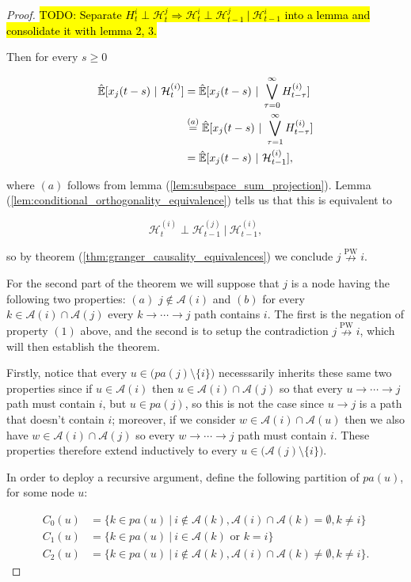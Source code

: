 \documentclass[12pt]{article}
\def\npwgc{\overset{\text{PW}}{\nrightarrow}}  %
\def\H{\mathcal{H}}  %
\newcommand{\linE}[2]{\hat{\E}[#1\ |\ #2]}  %
\newcommand{\pa}[1]{pa(#1)}  %
\newcommand{\anc}[1]{\mathcal{A}(#1)}  %
\begin{document}
\begin{proof}
  \hl{TODO: Separate $H_t^i \perp \H_t^j \Rightarrow \H_t^i \perp \H_{t - 1}^j\ |\ \H_{t - 1}^i$ into a lemma and consolidate it with lemma 2, 3.}

  Then for every $s \ge 0$

  \begin{align*}
    \linE{x_j(t - s)}{\H_t^{(i)}} &= \linE{x_j(t - s)}{\bigvee_{\tau = 0}^\infty H_{t - \tau}^{(i)}}\\
    &\overset{(a)}{=} \linE{x_j(t - s)}{\bigvee_{\tau = 1}^\infty H_{t - \tau}^{(i)}}\\
    &= \linE{x_j(t - s)}{\H_{t - 1}^{(i)}},
  \end{align*}

  where $(a)$ follows from lemma (\ref{lem:subspace_sum_projection}).  Lemma (\ref{lem:conditional_orthogonality_equivalence}) tells us that this is equivalent to

  \begin{equation*}
    \H_t^{(i)} \perp \H_{t - 1}^{(j)}\ |\ \H_{t - 1}^{(i)},
  \end{equation*}

  so by theorem (\ref{thm:granger_causality_equivalences}) we conclude $j \npwgc i$.

  For the second part of the theorem we will suppose that $j$ is a node having the following two properties: $(a)$ $j \not \in \anc{i}$ and $(b)$ for every $k \in \anc{i} \cap \anc{j}$ every $k \rightarrow \cdots \rightarrow j$ path contains $i$.  The first is the negation of property $(1)$ above, and the second is to setup the contradiction $j \npwgc i$, which will then establish the theorem.

  Firstly, notice that every $u \in \big(\pa{j} \setminus \{i\}\big)$ necesssarily inherits these same two properties since if $u \in \anc{i}$ then $u \in \anc{i} \cap \anc{j}$ so that every $u \rightarrow \cdots \rightarrow j$ path must contain $i$, but $u \in \pa{j}$, so this is not the case since $u \rightarrow j$ is a path that doesn't contain $i$; moreover, if we consider $w \in \anc{i} \cap \anc{u}$ then we also have $w \in \anc{i} \cap \anc{j}$ so every $w \rightarrow \cdots \rightarrow j$ path must contain $i$.  These properties therefore extend inductively to every $u \in \big(\anc{j} \setminus \{i\}\big)$.

  In order to deploy a recursive argument, define the following partition of $\pa{u}$, for some node $u$:

  \begin{align*}
    C_0(u) &= \{k \in \pa{u}\ |\ i \not\in \anc{k}, \anc{i} \cap \anc{k} = \emptyset, k \ne i\}\\
    C_1(u) &= \{k \in \pa{u}\ |\ i \in \anc{k} \text{ or } k = i\}\\
    C_2(u) &= \{k \in \pa{u}\ |\ i \not\in \anc{k}, \anc{i} \cap \anc{k} \ne \emptyset, k \ne i\}.
  \end{align*}


\end{proof}
\end{document}
